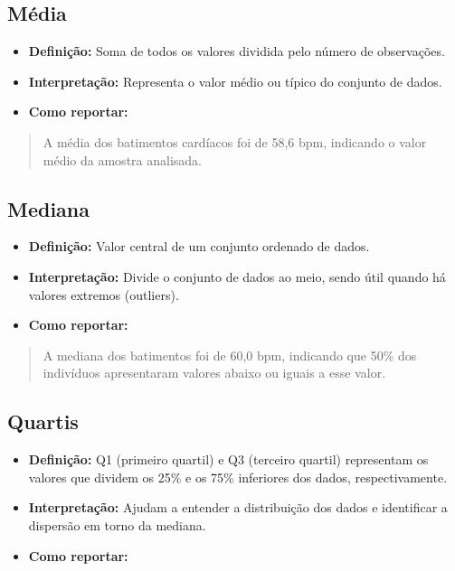 \documentclass[
]{book}
\providecommand{\tightlist}{%
  \setlength{\itemsep}{0pt}\setlength{\parskip}{0pt}}
\begin{document}
\subsection{Média}\label{muxe9dia}

\begin{itemize}
\tightlist
\item
  \textbf{Definição:} Soma de todos os valores dividida pelo número de observações.\\
\item
  \textbf{Interpretação:} Representa o valor médio ou típico do conjunto de dados.\\
\item
  \textbf{Como reportar:}
\end{itemize}

\begin{quote}
A média dos batimentos cardíacos foi de 58,6 bpm, indicando o valor médio da amostra analisada.
\end{quote}

\subsection{Mediana}\label{mediana}

\begin{itemize}
\tightlist
\item
  \textbf{Definição:} Valor central de um conjunto ordenado de dados.\\
\item
  \textbf{Interpretação:} Divide o conjunto de dados ao meio, sendo útil quando há valores extremos (outliers).\\
\item
  \textbf{Como reportar:}
\end{itemize}

\begin{quote}
A mediana dos batimentos foi de 60,0 bpm, indicando que 50\% dos indivíduos apresentaram valores abaixo ou iguais a esse valor.
\end{quote}

\subsection{Quartis}\label{quartis}

\begin{itemize}
\tightlist
\item
  \textbf{Definição:} Q1 (primeiro quartil) e Q3 (terceiro quartil) representam os valores que dividem os 25\% e os 75\% inferiores dos dados, respectivamente.\\
\item
  \textbf{Interpretação:} Ajudam a entender a distribuição dos dados e identificar a dispersão em torno da mediana.\\
\item
  \textbf{Como reportar:}
\end{itemize}
\end{document}
